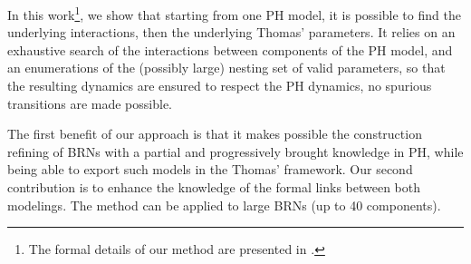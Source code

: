 In this work\footnote{The formal details of our method are presented in \cite{FPIMR12-CMSB}.}, we show that starting from one PH model,
it is possible to find the underlying interactions, then the underlying Thomas' parameters.
It relies on an exhaustive search of the interactions between components of the PH model,
and an enumerations of the (possibly large) nesting set of valid parameters,
so that the resulting dynamics are ensured to respect the PH dynamics, \ie no spurious transitions are made possible.

The first benefit of our approach is that it makes possible the construction refining of BRNs with a partial and progressively brought knowledge in PH, while being able to export such models in the Thomas' framework.
Our second contribution is to enhance the knowledge of the formal links between both modelings.
The method can be applied to large BRNs (up to 40 components).

\begin{comment}
\paragraph{Outline.}
\pref{sec:frameworks} recalls the PH and Thomas frameworks;
\pref{sec:infer-IG} defines the IG inference from PH;
\pref{sec:infer-K} details the enumeration of Thomas parametrizations compatible with a PH;
\pref{sec:examples} gives some information about the implementation of the method.
\end{comment}
